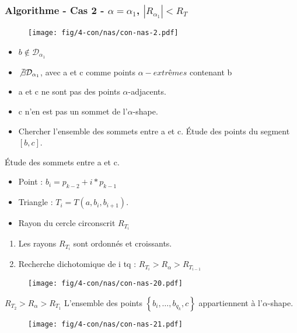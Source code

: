 \begin{frame}
\frametitle{Algorithme - Cas 2 - $\alpha = \alpha_{1}$, $|R_{\alpha_{1}}| < R_T$}
{
  \begin{figure}[H]
    \centering
    \texttt{[image: fig/4-con/nas/con-nas-2.pdf]}
  \end{figure}

  \begin{block}{}
    \begin{itemize}
      \item $b \not\in \mathcal{D}_{\alpha_1}$
      \item $\not\exists \mathcal{D}_{\alpha_1}$, avec a et c comme points $\alpha-extrêmes$ contenant b
      \item a et c ne sont pas des points $\alpha$-adjacents.
      \item \alert{c n'en est pas un sommet de l'$\alpha$-shape.}
      \item \alert{Chercher l'ensemble des sommets entre a et c.}
        Étude des points du segment $[b,c]$.
    \end{itemize}
  \end{block}
}
{
  \begin{block}{Étude des sommets entre a et c.}
    \begin{itemize}
      \item Point : $b_i = p_{k-2} + i*p_{k-1}$
      \item Triangle : $T_i = T(a, b_{i}, b_{i+1})$.
      \item Rayon du cercle circonscrit $R_{T_{i}}$
     \end{itemize}
   
     \begin{enumerate}
       \item \alert{Les rayons $R_{T_{i}}$ sont ordonnés et croissants.}
       \item Recherche dichotomique de i tq : $R_{T_{i}} > R_{\alpha} > R_{T_{i-1}}$
     \end{enumerate}
  \end{block}

  \begin{figure}[H]
    \centering
    \texttt{[image: fig/4-con/nas/con-nas-20.pdf]}
  \end{figure}
}
{
  \begin{block}{$R_{T_{2}} > R_{\alpha} > R_{T_{1}}$}
    \alert{L'ensemble des points $\left\{ b_{i}, \ldots, b_{q_k}, c \right\}$ appartiennent à l'$\alpha$-shape.}
  \end{block}

  \begin{figure}[H]
    \centering
    \texttt{[image: fig/4-con/nas/con-nas-21.pdf]}
  \end{figure}
}
\end{frame}

